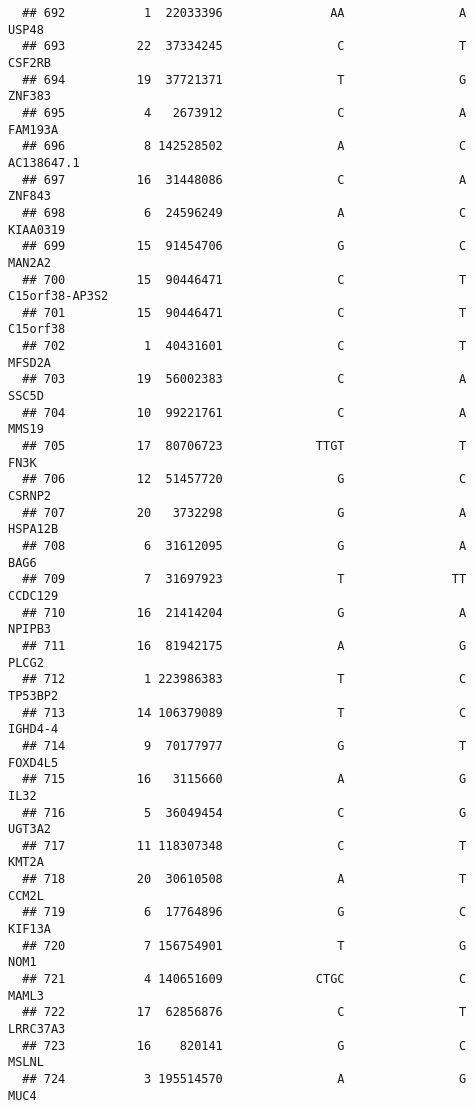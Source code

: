 \documentclass[12pt,twoside]{reedthesis}
\theoremstyle{definition}
\theoremstyle{definition}
\theoremstyle{remark}
\begin{document}
\begin{verbatim}
  ## 692           1  22033396               AA                A          USP48
  ## 693          22  37334245                C                T         CSF2RB
  ## 694          19  37721371                T                G         ZNF383
  ## 695           4   2673912                C                A        FAM193A
  ## 696           8 142528502                A                C     AC138647.1
  ## 697          16  31448086                C                A         ZNF843
  ## 698           6  24596249                A                C       KIAA0319
  ## 699          15  91454706                G                C         MAN2A2
  ## 700          15  90446471                C                T C15orf38-AP3S2
  ## 701          15  90446471                C                T       C15orf38
  ## 702           1  40431601                C                T         MFSD2A
  ## 703          19  56002383                C                A          SSC5D
  ## 704          10  99221761                C                A          MMS19
  ## 705          17  80706723             TTGT                T           FN3K
  ## 706          12  51457720                G                C         CSRNP2
  ## 707          20   3732298                G                A        HSPA12B
  ## 708           6  31612095                G                A           BAG6
  ## 709           7  31697923                T               TT        CCDC129
  ## 710          16  21414204                G                A         NPIPB3
  ## 711          16  81942175                A                G          PLCG2
  ## 712           1 223986383                T                C        TP53BP2
  ## 713          14 106379089                T                C        IGHD4-4
  ## 714           9  70177977                G                T        FOXD4L5
  ## 715          16   3115660                A                G           IL32
  ## 716           5  36049454                C                G         UGT3A2
  ## 717          11 118307348                C                T          KMT2A
  ## 718          20  30610508                A                T          CCM2L
  ## 719           6  17764896                G                C         KIF13A
  ## 720           7 156754901                T                G           NOM1
  ## 721           4 140651609             CTGC                C          MAML3
  ## 722          17  62856876                C                T       LRRC37A3
  ## 723          16    820141                G                C          MSLNL
  ## 724           3 195514570                A                G           MUC4

\end{verbatim}
\end{document}
